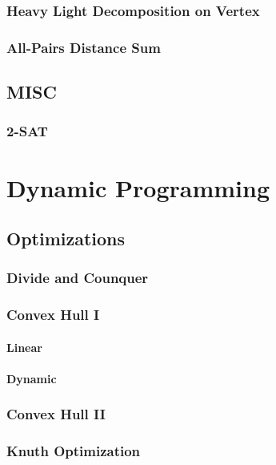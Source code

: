 \documentclass[10pt,a4paper]{report}
\begin{document}
		\subsection{Heavy Light Decomposition on Vertex}
		\subsection{All-Pairs Distance Sum}
		
	\section{MISC}
		\subsection{2-SAT}
		
\chapter{Dynamic Programming}

	\section{Optimizations}
		\subsection{Divide and Counquer}
			
		\newpage
		\subsection{Convex Hull I}
			\subsubsection{Linear}
				
			\newpage
			\subsubsection{Dynamic}
				
		\subsection{Convex Hull II}
		\subsection{Knuth Optimization}
\end{document}
